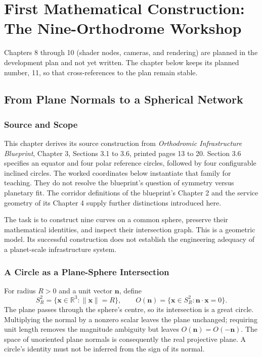 \setcounter{part}{3}
\part{First Mathematical Construction: The Nine-Orthodrome Workshop}

\begin{checkpoint}[Numbering]
Chapters 8 through 10 (shader nodes, cameras, and rendering) are planned in the development plan and not yet written. The chapter below keeps its planned number, 11, so that cross-references to the plan remain stable.
\end{checkpoint}

\setcounter{chapter}{10}
\chapter{From Plane Normals to a Spherical Network}

\section{Source and Scope}

This chapter derives its source construction from \emph{Orthodromic Infrastructure Blueprint}, Chapter 3, Sections 3.1 to 3.6, printed pages 13 to 20. Section 3.6 specifies an equator and four polar reference circles, followed by four configurable inclined circles. The worked coordinates below instantiate that family for teaching. They do not resolve the blueprint's question of symmetry versus planetary fit. The corridor definitions of the blueprint's Chapter 2 and the service geometry of its Chapter 4 supply further distinctions introduced here.

The task is to construct nine curves on a common sphere, preserve their mathematical identities, and inspect their intersection graph. This is a geometric model. Its successful construction does not establish the engineering adequacy of a planet-scale infrastructure system.

\section{A Circle as a Plane-Sphere Intersection}

For radius $R>0$ and a unit vector $\mathbf n$, define
\[
  S_R^2=\{\mathbf x\in\mathbb R^3:\|\mathbf x\|=R\},\qquad
  O(\mathbf n)=\{\mathbf x\in S_R^2:\mathbf n\cdot\mathbf x=0\}.
\]
The plane passes through the sphere's centre, so its intersection is a great circle. Multiplying the normal by a nonzero scalar leaves the plane unchanged; requiring unit length removes the magnitude ambiguity but leaves $O(\mathbf n)=O(-\mathbf n)$. The space of unoriented plane normals is consequently the real projective plane. A circle's identity must not be inferred from the sign of its normal.

